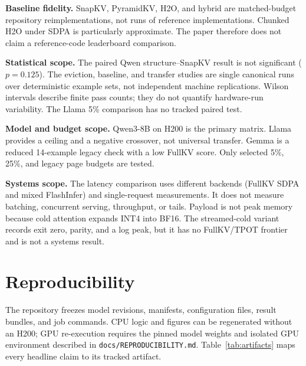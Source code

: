 \documentclass[10pt]{article}
\begin{document}
\textbf{Baseline fidelity.}
SnapKV, PyramidKV, H2O, and hybrid are matched-budget repository
reimplementations, not runs of reference implementations.  Chunked H2O under
SDPA is particularly approximate.  The paper therefore does not claim a
reference-code leaderboard comparison.

\textbf{Statistical scope.}
The paired Qwen structure--SnapKV result is not significant ($p=0.125$).  The
eviction, baseline, and transfer studies are single canonical runs over
deterministic example sets, not independent
machine replications.  Wilson intervals describe finite pass counts; they do
not quantify hardware-run variability.  The Llama 5\% comparison has no tracked
paired test.

\textbf{Model and budget scope.}
Qwen3-8B on H200 is the primary matrix.  Llama provides a ceiling and a negative
crossover, not universal transfer.  Gemma is a reduced 14-example legacy check
with a low FullKV score.  Only selected 5\%, 25\%, and legacy page budgets are
tested.

\textbf{Systems scope.}
The latency comparison uses different backends (FullKV SDPA and mixed
FlashInfer) and single-request measurements.  It does not measure batching,
concurrent serving, throughput, or tails.  Payload is not peak memory because
cold attention expands INT4 into BF16.  The streamed-cold variant records exit zero,
parity, and a log peak, but it has no FullKV/TPOT frontier and is not a systems
result.

\section{Reproducibility}
\label{sec:reproducibility}

The repository freezes model revisions, manifests, configuration files, result
bundles, and job commands.  CPU logic and figures can be regenerated without an
H200; GPU re-execution requires the pinned model weights and isolated GPU
environment described in \texttt{docs/REPRODUCIBILITY.md}.  Table~\ref{tab:artifacts}
maps every headline claim to its tracked artifact.
\end{document}
